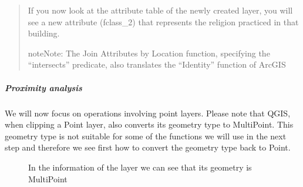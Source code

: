 \documentclass[letterpaper,10pt,english]{sphinxmanual}
\let\sphinxpxdimen\pdfpxdimen\else\newdimen\sphinxpxdimen
\begin{document}
\begin{quote}
If you now look at the attribute table of the newly created layer, you will see a new attribute (fclass\_2)
that represents the religion practiced in that building.

\noindent{}

\begin{sphinxadmonition}{note}{Note:}
The Join Attributes by Location function, specifying the “intersects” predicate, also translates the “Identity” function of ArcGIS
\end{sphinxadmonition}
\end{quote}


\subparagraph{Proximity analysis}
\label{\detokenize{vector/proximity:proximity-analysis}}\label{\detokenize{vector/proximity::doc}}
We will now focus on operations involving point layers. Please note that QGIS, when clipping a Point layer, also converts
its geometry type to MultiPoint. This geometry type is not suitable for some of the functions we will use in the next step
and therefore we see first how to convert the geometry type back to Point.

\begin{figure}[htbp]
\centering
\capstart

\noindent\sphinxincludegraphics[width=800\sphinxpxdimen]{{3.4_MultiPoint}.PNG}
\caption{In the information of the  layer we can see that its geometry is MultiPoint}\label{\detokenize{vector/proximity:id1}}\end{figure}
\end{document}
